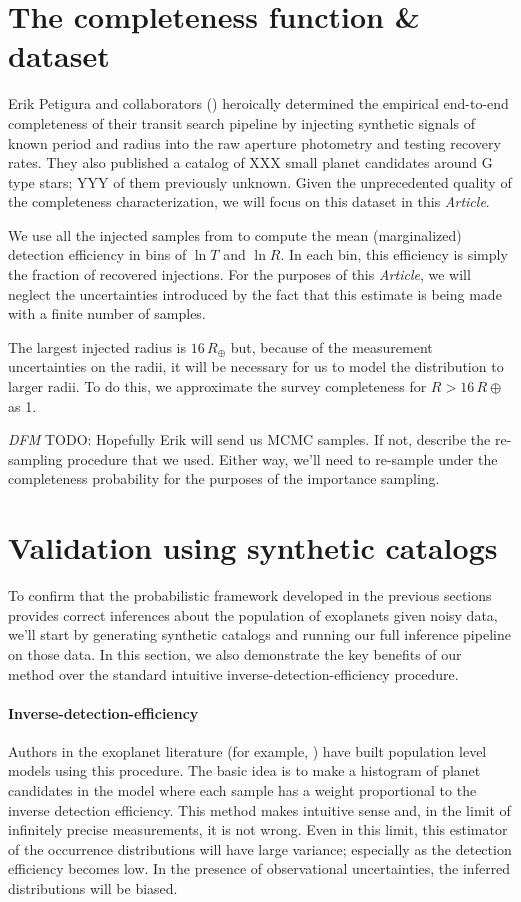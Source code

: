 \documentclass[12pt,preprint]{aastex}
\newcommand{\paper}{\emph{Article}}
\newcommand{\todo}[3]{{\color{#2} \emph{#1} TODO: #3}}
\newcommand{\dfmtodo}[1]{\todo{DFM}{red}{#1}}
\newcommand{\radius}{\ensuremath{R}}
\newcommand{\period}{\ensuremath{T}}
\begin{document}
\section{The completeness function \& dataset}

Erik Petigura and collaborators (\citealt{petigura-a,petigura}) heroically
determined the empirical end-to-end completeness of their transit search
pipeline by injecting synthetic signals of known period and radius into the
raw aperture photometry and testing recovery rates.
They also published a catalog of XXX small planet candidates around G type
stars; YYY of them previously unknown.
Given the unprecedented quality of the completeness characterization, we will
focus on this dataset in this \paper.

We use all the injected samples from \citet{petigura} to compute the mean
(marginalized) detection efficiency in bins of $\ln\period$ and $\ln\radius$.
In each bin, this efficiency is simply the fraction of recovered injections.
For the purposes of this \paper, we will neglect the uncertainties introduced
by the fact that this estimate is being made with a finite number of samples.

The largest injected radius is $16\,R_\oplus$ but, because of the measurement
uncertainties on the radii, it will be necessary for us to model the
distribution to larger radii.
To do this, we approximate the survey completeness for $\radius > 16\,R\oplus$
as 1.

\dfmtodo{Hopefully Erik will send us MCMC samples. If not, describe the
re-sampling procedure that we used. Either way, we'll need to re-sample under
the completeness probability for the purposes of the importance sampling.}

\section{Validation using synthetic catalogs}

To confirm that the probabilistic framework developed in the previous sections
provides correct inferences about the population of exoplanets given noisy
data, we'll start by generating synthetic catalogs and running our full
inference pipeline on those data.
In this section, we also demonstrate the key benefits of our method over the
standard intuitive inverse-detection-efficiency procedure.

\paragraph{Inverse-detection-efficiency}
Authors in the exoplanet literature (for example, \citealt{howard, dressing,
petigura}) have built population level models using this procedure.
The basic idea is to make a histogram of planet candidates in the model where
each sample has a weight proportional to the inverse detection efficiency.
This method makes intuitive sense and, in the limit of infinitely precise
measurements, it is not wrong.
Even in this limit, this estimator of the occurrence distributions will have
large variance; especially as the detection efficiency becomes low.
In the presence of observational uncertainties, the inferred distributions
will be biased.
\end{document}
